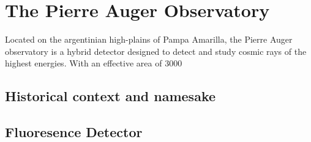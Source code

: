 
\chapter{The Pierre Auger Observatory}
\label{chap:auger-observatory}

Located on the argentinian high-plains of Pampa Amarilla, the Pierre Auger 
observatory is a hybrid detector designed to detect and study cosmic rays of the
highest energies. With an effective area of \SI{3000}{\kilo\meter\square}

\section{Historical context and namesake}
\label{sec:auger-history}



\section{Fluoresence Detector}
\label{sec:fluoresence-detector}




